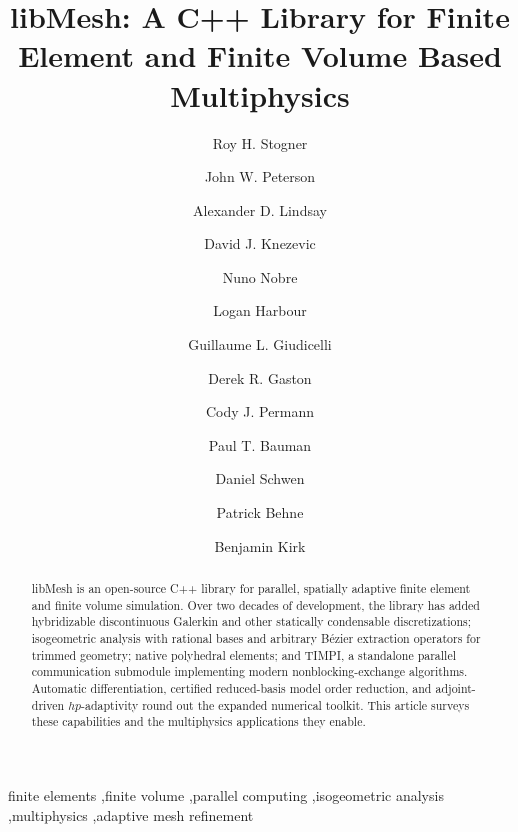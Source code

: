 \documentclass[preprint,12pt, a4paper]{elsarticle}
\begin{document}
\renewcommand{\labelenumii}{\arabic{enumi}.\arabic{enumii}}

\begin{frontmatter}

\title{libMesh: A C++ Library for Finite Element and Finite Volume Based Multiphysics}

\author[inl]{Roy H. Stogner}
\author[akselos]{John W. Peterson}
\author[inl]{Alexander D. Lindsay}
\author[akselos]{David J. Knezevic}
\author[hartree]{Nuno Nobre}
\author[inl]{Logan Harbour}
\author[inl]{Guillaume L. Giudicelli}
\author[inl]{Derek R. Gaston}
\author[inl]{Cody J. Permann}
\author[ub]{Paul T. Bauman}
\author[inlcmm]{Daniel Schwen}
\author[inl]{Patrick Behne}
\author[ut]{Benjamin Kirk}

\address[inl]{Computational Frameworks, Idaho National Laboratory, Idaho Falls, ID 83415, USA}
\address[akselos]{Akselos}
\address[hartree]{Hartree Centre, Science and Technology Facilities Council (STFC), UK}
\address[ub]{University at Buffalo, Department of Mechanical and Aerospace Engineering, Buffalo, NY, USA}
\address[inlcmm]{Computational Mechanics and Materials, Idaho National Laboratory, Idaho Falls, ID 83415, USA}
\address[ut]{Department of Aerospace Engineering and Engineering Mechanics (ASE), University of Texas at Austin, Austin, TX, USA}

\begin{abstract}
libMesh is an open-source C++ library for parallel, spatially adaptive finite element and finite
volume simulation. Over two decades of development, the library has added
hybridizable discontinuous Galerkin and other statically condensable discretizations; isogeometric
analysis with rational bases and arbitrary B\'ezier extraction operators for trimmed geometry;
native polyhedral elements; and TIMPI, a standalone parallel communication submodule implementing
modern nonblocking-exchange algorithms. Automatic differentiation, certified reduced-basis model
order reduction, and adjoint-driven $hp$-adaptivity round out the expanded numerical toolkit. This
article surveys these capabilities and the multiphysics applications they enable.
\end{abstract}

\begin{keyword}
finite elements \sep finite volume \sep parallel computing \sep isogeometric analysis \sep multiphysics \sep adaptive mesh refinement
\end{keyword}

\end{frontmatter}
\end{document}
